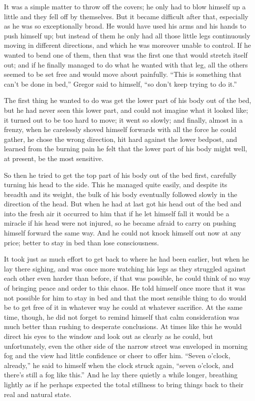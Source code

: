\documentclass[12pt]{report}
\begin{document}
It was a simple matter to throw off the covers; he only had to blow
himself up a little and they fell off by themselves. But it became
difficult after that, especially as he was so exceptionally broad. He
would have used his arms and his hands to push himself up; but instead
of them he only had all those little legs continuously moving in
different directions, and which he was moreover unable to control. If he
wanted to bend one of them, then that was the first one that would
stretch itself out; and if he finally managed to do what he wanted with
that leg, all the others seemed to be set free and would move about
painfully. ``This is something that can't be done in bed,'' Gregor said
to himself, ``so don't keep trying to do it.''

The first thing he wanted to do was get the lower part of his body out
of the bed, but he had never seen this lower part, and could not imagine
what it looked like; it turned out to be too hard to move; it went so
slowly; and finally, almost in a frenzy, when he carelessly shoved
himself forwards with all the force he could gather, he chose the wrong
direction, hit hard against the lower bedpost, and learned from the
burning pain he felt that the lower part of his body might well, at
present, be the most sensitive.

So then he tried to get the top part of his body out of the bed first,
carefully turning his head to the side. This he managed quite easily,
and despite its breadth and its weight, the bulk of his body eventually
followed slowly in the direction of the head. But when he had at last
got his head out of the bed and into the fresh air it occurred to him
that if he let himself fall it would be a miracle if his head were not
injured, so he became afraid to carry on pushing himself forward the
same way. And he could not knock himself out now at any price; better to
stay in bed than lose consciousness.

It took just as much effort to get back to where he had been earlier,
but when he lay there sighing, and was once more watching his legs as
they struggled against each other even harder than before, if that was
possible, he could think of no way of bringing peace and order to this
chaos. He told himself once more that it was not possible for him to
stay in bed and that the most sensible thing to do would be to get free
of it in whatever way he could at whatever sacrifice. At the same time,
though, he did not forget to remind himself that calm consideration was
much better than rushing to desperate conclusions. At times like this he
would direct his eyes to the window and look out as clearly as he could,
but unfortunately, even the other side of the narrow street was
enveloped in morning fog and the view had little confidence or cheer to
offer him. ``Seven o'clock, already,'' he said to himself when the clock
struck again, ``seven o'clock, and there's still a fog like this.'' And
he lay there quietly a while longer, breathing lightly as if he perhaps
expected the total stillness to bring things back to their real and
natural state.
\end{document}
